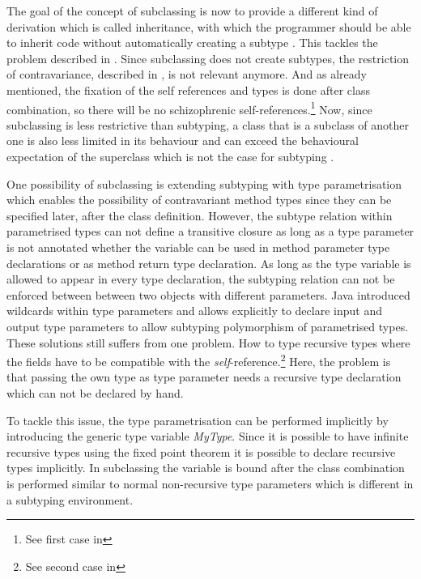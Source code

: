 The goal of the concept of subclassing is now to provide a different kind
of derivation which is called inheritance, with which the programmer
should be able to inherit code without automatically creating a subtype
\cite{simons_theory_2002-2}. This tackles the problem described in
. Since subclassing does not create subtypes, the
restriction of contravariance, described in ,
is not relevant anymore. And as already mentioned, the fixation of the
self references and types is done after class combination, so there
will be no schizophrenic self-references.\footnote{See first case in
} Now, since subclassing is less restrictive
than subtyping, a class that is a subclass of another one
is also less limited in its behaviour and
can exceed the behavioural expectation of the superclass which is not
the case for subtyping \cite{simons_theory_2002-2}.

One possibility of subclassing is extending subtyping with type
parametrisation which enables the possibility of contravariant
method types since they can be specified later, after the class
definition. However, the subtype relation within parametrised types
can not define a transitive closure as long as a type parameter is not
annotated whether the variable can be used in method parameter type
declarations or as method return type declaration. As long as the type
variable is allowed to appear in every type declaration, the subtyping
relation can not be enforced between between two objects with different
parameters.  Java introduced wildcards within type parameters and \cs
allows explicitly to declare input and output type parameters to allow
subtyping polymorphism of parametrised types. These solutions still
suffers from one problem. How to type recursive types where the fields
have to be compatible with the \emph{self}-reference.\footnote{See second
case in } Here, the problem is that passing
the own type as type parameter needs a recursive type declaration which
can not be declared by hand.

To tackle this issue, the type parametrisation can be performed
implicitly by introducing the generic type variable \emph{MyType}. Since
it is possible to have infinite recursive types using the fixed point
theorem \cite{pierce_types_2002} it is possible to declare recursive
types implicitly. In subclassing the \mytype variable is bound after
the class combination is performed similar to normal non-recursive type
parameters which is different in a subtyping environment.


